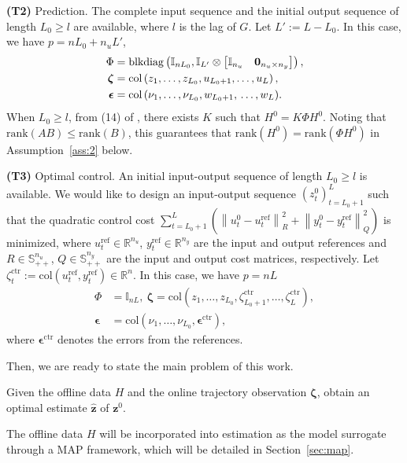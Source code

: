 \documentclass{ifacconf}
\newcommand{\norm}[1]{\left\lVert#1\right\rVert}
\newcommand{\col}[1]{\mathrm{col}\left(#1\right)}
\newcommand{\rank}[1]{\mathrm{rank}\left(#1\right)}
\newcommand{\blkdiag}[1]{\mathrm{blkdiag}\left(#1\right)}
\begin{document}
\textbf{(T2)} Prediction. The complete input sequence and the initial output sequence of length $L_0\geq l$ are available, where $l$ is the lag of $G$. Let $L':=L-L_0$. In this case, we have $p=nL_0+n_uL'$,
\begin{align*}
    \Phi&=\blkdiag{\mathbb{I}_{nL_0},\mathbb{I}_{L'}\otimes\begin{bmatrix}
    \mathbb{I}_{n_u}&\mathbf{0}_{n_u\times n_y}
\end{bmatrix}},\\
    \boldsymbol{\zeta}&=\col{z_1  ,\dots,z_{L_0},u_{L_0+1},\dots,u_L},\\
    \boldsymbol{\epsilon}&=\textrm{col}\,(\nu_1,\dots,\nu_{L_0},w_{L_0+1},\newline\dots,w_L).
\end{align*}
When $L_0\geq l$, from (14) of \cite{Iannelli_2021}, there exists $K$ such that $H^0=K\Phi H^0$. Noting that $\rank{AB}\leq\rank{B}$, this guarantees that $\rank{H^0}=\rank{\Phi H^0}$ in Assumption~\ref{ass:2} below.

\textbf{(T3)} Optimal control. An initial input-output sequence of length $L_0\geq l$ is available. We would like to design an input-output sequence $(z_t^0)_{t=L_0+1}^L$ such that the quadratic control cost $\sum_{t=L_0+1}^L\left(\norm{u_t^0-u_t^\mathrm{ref}}_R^2+\norm{y_t^0-y_t^\mathrm{ref}}_Q^2\right)$ is minimized, where $u_t^\mathrm{ref}\in\mathbb{R}^{n_u}$, $y_t^\mathrm{ref}\in\mathbb{R}^{n_y}$ are the input and output references and $R\in\mathbb{S}_{++}^{n_u}$, $Q\in\mathbb{S}_{++}^{n_y}$ are the input and output cost matrices, respectively. Let $\zeta_t^\mathrm{ctr}:=\col{u_t^\mathrm{ref},y_t^\mathrm{ref}}\in\mathbb{R}^n$. In this case, we have $p=nL$
\begin{align*}
    \Phi&=\mathbb{I}_{nL},\ \boldsymbol{\zeta}=\col{z_1,\dots,z_{L_0}  ,\zeta_{L_0+1}^\mathrm{ctr},\dots,\zeta_L^\mathrm{ctr}},\\
    \boldsymbol{\epsilon}&=\col{\nu_1,\dots,\nu_{L_0},\boldsymbol{\epsilon}^\mathrm{ctr}},
\end{align*}
where $\boldsymbol{\epsilon}^\mathrm{ctr}$ denotes the errors from the references.

Then, we are ready to state the main problem of this work.
\begin{prob}
    Given the offline data $H$ and the online trajectory observation $\boldsymbol{\zeta}$, obtain an optimal estimate $\hat{\mathbf{z}}$ of $\mathbf{z}^0$.
    \label{prob:1}
\end{prob}
\vspace{-1.5em}
The offline data $H$ will be incorporated into estimation as the model surrogate through a MAP framework, which will be detailed in Section~\ref{sec:map}.
\end{document}
